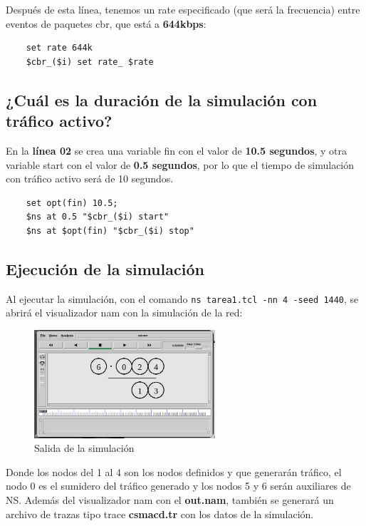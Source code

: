 \documentclass{article}
\begin{document}
Después de esta línea, tenemos un rate especificado (que será la frecuencia) entre eventos de paquetes cbr, que está a \textbf{644kbps}:

\begin{verbatim}
    set rate 644k
    $cbr_($i) set rate_ $rate
\end{verbatim}

\subsection{¿Cuál es la duración de la simulación con tráfico activo?}

En la \textbf{línea 02} se crea una variable fin con el valor de \textbf{10.5 segundos}, y otra variable start con el valor de \textbf{0.5 segundos}, por lo que el tiempo de simulación con tráfico activo será de 10 segundos.

\begin{verbatim}
    set opt(fin) 10.5;
    $ns at 0.5 "$cbr_($i) start"
    $ns at $opt(fin) "$cbr_($i) stop"
\end{verbatim}

\subsection{Ejecución de la simulación}

Al ejecutar la simulación, con el comando \verb|ns tarea1.tcl -nn 4 -seed 1440|, se abrirá el visualizador nam con la simulación de la red:
\newpage
\begin{figure}[h]
	\centering
	\includegraphics[width=0.6\textwidth]{src/outnam.png}
	\caption{Salida de la simulación}
\end{figure}

Donde los nodos del 1 al 4 son los nodos definidos y que generarán tráfico, el
nodo 0 es el sumidero del tráfico generado y los nodos 5 y 6 serán auxiliares de NS. Además del visualizador nam con el \textbf{out.nam}, también se generará un archivo de trazas tipo trace \textbf{csmacd.tr} con los datos de la simulación.
\end{document}
